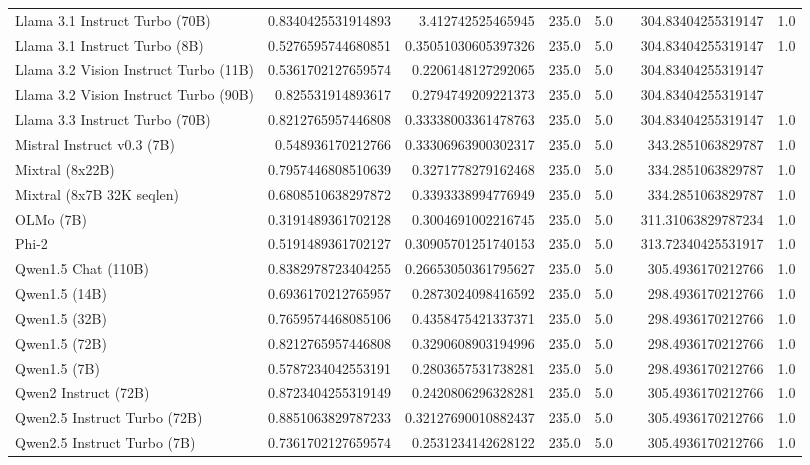 \begin{table}[htp]
{\begin{tabular}{lrrrrrrr}
Llama 3.1 Instruct Turbo (70B) & 0.8340425531914893 & 3.412742525465945 & 235.0 & 5.0 &  & 304.83404255319147 & 1.0 \\
Llama 3.1 Instruct Turbo (8B) & 0.5276595744680851 & 0.35051030605397326 & 235.0 & 5.0 &  & 304.83404255319147 & 1.0 \\
Llama 3.2 Vision Instruct Turbo (11B) & 0.5361702127659574 & 0.2206148127292065 & 235.0 & 5.0 &  & 304.83404255319147 &  \\
Llama 3.2 Vision Instruct Turbo (90B) & 0.825531914893617 & 0.2794749209221373 & 235.0 & 5.0 &  & 304.83404255319147 &  \\
Llama 3.3 Instruct Turbo (70B) & 0.8212765957446808 & 0.33338003361478763 & 235.0 & 5.0 &  & 304.83404255319147 & 1.0 \\
Mistral Instruct v0.3 (7B) & 0.548936170212766 & 0.33306963900302317 & 235.0 & 5.0 &  & 343.2851063829787 & 1.0 \\
Mixtral (8x22B) & 0.7957446808510639 & 0.3271778279162468 & 235.0 & 5.0 &  & 334.2851063829787 & 1.0 \\
Mixtral (8x7B 32K seqlen) & 0.6808510638297872 & 0.3393338994776949 & 235.0 & 5.0 &  & 334.2851063829787 & 1.0 \\
OLMo (7B) & 0.3191489361702128 & 0.3004691002216745 & 235.0 & 5.0 &  & 311.31063829787234 & 1.0 \\
Phi-2 & 0.5191489361702127 & 0.30905701251740153 & 235.0 & 5.0 &  & 313.72340425531917 & 1.0 \\
Qwen1.5 Chat (110B) & 0.8382978723404255 & 0.26653050361795627 & 235.0 & 5.0 &  & 305.4936170212766 & 1.0 \\
Qwen1.5 (14B) & 0.6936170212765957 & 0.2873024098416592 & 235.0 & 5.0 &  & 298.4936170212766 & 1.0 \\
Qwen1.5 (32B) & 0.7659574468085106 & 0.4358475421337371 & 235.0 & 5.0 &  & 298.4936170212766 & 1.0 \\
Qwen1.5 (72B) & 0.8212765957446808 & 0.3290608903194996 & 235.0 & 5.0 &  & 298.4936170212766 & 1.0 \\
Qwen1.5 (7B) & 0.5787234042553191 & 0.2803657531738281 & 235.0 & 5.0 &  & 298.4936170212766 & 1.0 \\
Qwen2 Instruct (72B) & 0.8723404255319149 & 0.2420806296328281 & 235.0 & 5.0 &  & 305.4936170212766 & 1.0 \\
Qwen2.5 Instruct Turbo (72B) & 0.8851063829787233 & 0.32127690010882437 & 235.0 & 5.0 &  & 305.4936170212766 & 1.0 \\
Qwen2.5 Instruct Turbo (7B) & 0.7361702127659574 & 0.2531234142628122 & 235.0 & 5.0 &  & 305.4936170212766 & 1.0 \\

\end{tabular}}
\end{table}
